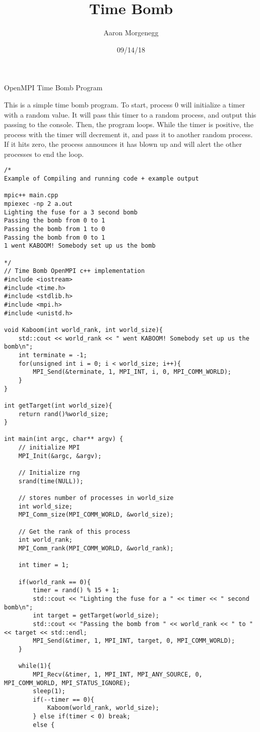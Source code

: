 \documentclass[12pt]{article}
\title{Time Bomb}
\author{Aaron Morgenegg}
\date{09/14/18}
\begin{document}
\maketitle

OpenMPI Time Bomb Program

This is a simple time bomb program. To start, process 0 will initialize a timer with a random value. It will pass this timer to a random process, and output this passing to the console. Then, the program loops. While the timer is positive, the process with the timer will decrement it, and pass it to another random process. If it hits zero, the process announces it has blown up and will alert the other processes to end the loop.

\begin{verbatim}
/*
Example of Compiling and running code + example output

mpic++ main.cpp
mpiexec -np 2 a.out
Lighting the fuse for a 3 second bomb
Passing the bomb from 0 to 1
Passing the bomb from 1 to 0
Passing the bomb from 0 to 1
1 went KABOOM! Somebody set up us the bomb

*/
// Time Bomb OpenMPI c++ implementation
#include <iostream>
#include <time.h>
#include <stdlib.h>
#include <mpi.h>
#include <unistd.h>

void Kaboom(int world_rank, int world_size){
	std::cout << world_rank << " went KABOOM! Somebody set up us the bomb\n";
	int terminate = -1;
	for(unsigned int i = 0; i < world_size; i++){
		MPI_Send(&terminate, 1, MPI_INT, i, 0, MPI_COMM_WORLD);
	}
}

int getTarget(int world_size){
	return rand()%world_size;
}

int main(int argc, char** argv) {
	// initialize MPI
	MPI_Init(&argc, &argv);

	// Initialize rng
	srand(time(NULL));

	// stores number of processes in world_size
	int world_size;
	MPI_Comm_size(MPI_COMM_WORLD, &world_size);

	// Get the rank of this process
	int world_rank;
	MPI_Comm_rank(MPI_COMM_WORLD, &world_rank);
	
	int timer = 1;

	if(world_rank == 0){
		timer = rand() % 15 + 1;
		std::cout << "Lighting the fuse for a " << timer << " second bomb\n";
		int target = getTarget(world_size);
		std::cout << "Passing the bomb from " << world_rank << " to " << target << std::endl;
		MPI_Send(&timer, 1, MPI_INT, target, 0, MPI_COMM_WORLD);
	}

	while(1){
		MPI_Recv(&timer, 1, MPI_INT, MPI_ANY_SOURCE, 0, MPI_COMM_WORLD, MPI_STATUS_IGNORE);
		sleep(1);
		if(--timer == 0){
			Kaboom(world_rank, world_size);
		} else if(timer < 0) break;
		else {
\end{verbatim}
\end{document}
